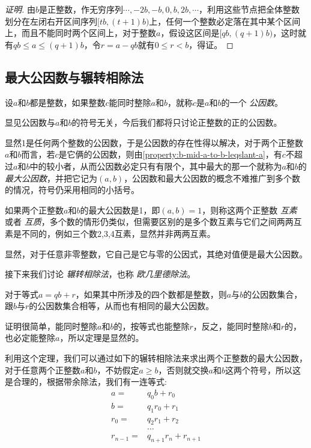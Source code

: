 \begin{proof}[证明]
  由$b$是正整数，作无穷序列$\cdots, -2b, -b, 0, b, 2b,\cdots$，利用这些节点把全体整数划分在左闭右开区间序列$[tb, (t+1)b)$上，任何一个整数必定落在其中某个区间上，而且不能同时两个区间上，对于整数$a$，假设这区间是$[qb, (q+1)b)$，这时就有$qb \leqslant a \leqslant (q+1)b$，令$r=a-qb$就有$0 \leqslant r < b$，得证。
\end{proof}

\subsection{最大公因数与辗转相除法}
\label{sec:greatest-common-factor}

\begin{definition}
  设$a$和$b$都是整数，如果整数$c$能同时整除$a$和$b$，就称$c$是$a$和$b$的一个 \emph{公因数}。
\end{definition}

显见公因数与$a$和$b$的符号无关，今后我们都将只讨论正整数的正的公因数。

显然1是任何两个整数的公因数，于是公因数的存在性得以解决，对于两个正整数$a$和$b$而言，若$c$是它俩的公因数，则由\autoref{property:b-mid-a-to-b-leqslant-a}，有$c$不超过$a$和$b$中的较小者，从而公因数必定只有有限个，其中最大的那一个就称为$a$和$b$的 \emph{最大公因数}，并把它记为$(a,b)$，公因数和最大公因数的概念不难推广到多个数的情况，符号仍采用相同的小括号。

如果两个正整数$a$和$b$的最大公因数是1，即$(a,b)=1$，则称这两个正整数 \emph{互素} 或者 \emph{互质}，多个数的情形仍类似，但需要区别的是多个数互素与它们之间两两互素是不同的，例如三个数2,3,4互素，显然并非两两互素。

显然，对于任意非零整数，它自己是它与零的公因式，其绝对值便是最大公因数。

接下来我们讨论 \emph{辗转相除法}，也称 \emph{欧几里德除法}。

\begin{theorem}
  对于等式$a=qb+r$，如果其中所涉及的四个数都是整数，则$a$与$b$的公因数集合，跟$b$与$r$的公因数集合相等，从而也有相同的最大公因数。
\end{theorem}

证明很简单，能同时整除$a$和$b$的，按等式也能整除$r$，反之，能同时整除$b$和$r$的，也必定能整除$a$，所以定理是显然的。

利用这个定理，我们可以通过如下的辗转相除法来求出两个正整数的最大公因数，对于任意两个正整数$a$和$b$，不妨假定$a \geqslant b$，否则就交换$a$和$b$这两个符号，所以这是合理的，根据带余除法，我们有一连等式:
\begin{align*}
  a  ={} & q_0 b + r_0 \\
  b  ={} &q_1 r_0 + r_1 \\
  r_0  ={}  &q_2 r_1 + r_2 \\
    {}&\ldots \\
  r_{n-1}  ={} &q_{n+1} r_n + r_{n+1}
\end{align*}

